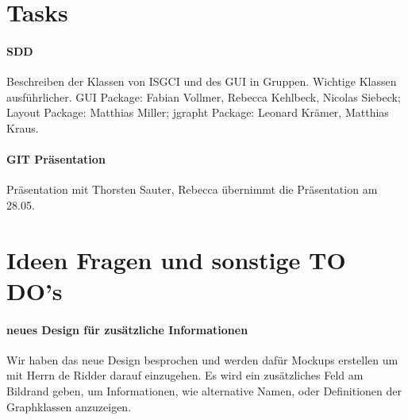 \documentclass{scrartcl}
\begin{document}
\section{Tasks}
\paragraph{SDD} Beschreiben der Klassen von ISGCI und des GUI in Gruppen. Wichtige Klassen ausführlicher. GUI Package: Fabian Vollmer, Rebecca Kehlbeck, Nicolas Siebeck; Layout Package: Matthias Miller; jgrapht Package: Leonard Krämer, Matthias Kraus. \\

\paragraph{GIT Präsentation} Präsentation mit Thorsten Sauter, Rebecca übernimmt die Präsentation am 28.05.

\section{Ideen Fragen und sonstige TO DO's}
\paragraph{neues Design für zusätzliche Informationen} Wir haben das neue Design besprochen und werden dafür Mockups erstellen um mit Herrn de Ridder darauf einzugehen. Es wird ein zusätzliches Feld am Bildrand geben, um Informationen, wie alternative Namen, oder Definitionen der Graphklassen anzuzeigen.
\end{document}
